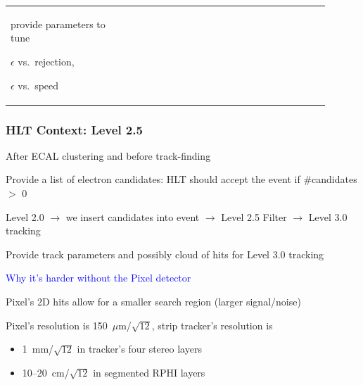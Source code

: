 \documentclass[12pt,compress]{beamer}
\begin{document}
\begin{frame}
\begin{center}
\begin{tabular}{p{0.3\linewidth} p{0.3\linewidth} p{0.3\linewidth}}
\begin{minipage}{\linewidth}
\begin{center}
\vspace{0.25 cm} \small provide parameters to tune

\vspace{0.25 cm} $\epsilon$ vs.\ rejection,

\vspace{0.25 cm} $\epsilon$ vs.\ speed

\end{center} \end{minipage}
\end{tabular}
\end{center}
\end{frame}

\begin{frame}
\frametitle{HLT Context: Level 2.5}

After ECAL clustering and before track-finding

\vfill
Provide a list of electron candidates: HLT should accept the event if \#candidates $>$ 0

\vspace{0.5 cm} {\scriptsize \color{blue} Level 2.0 $\rightarrow$ we insert
candidates into event $\rightarrow$ Level 2.5 Filter
$\rightarrow$ Level 3.0 tracking}

\vfill
Provide track parameters and possibly cloud of hits for Level 3.0 tracking
\end{frame}

\begin{frame}
\textcolor{blue}{\Large \hspace{-0.87 cm} Why it's harder without the Pixel detector}

\vspace{0.5 cm}
Pixel's 2D hits allow for a smaller search region (larger signal/noise)

\vspace{0.25 cm}
Pixel's resolution is 150~$\mu$m/$\sqrt{12}$, strip tracker's resolution is
\begin{itemize}
\item 1~mm/$\sqrt{12}$ in tracker's four stereo layers
\item 10--20~cm/$\sqrt{12}$ in segmented RPHI layers
\end{itemize}

\end{frame}
\end{document}
